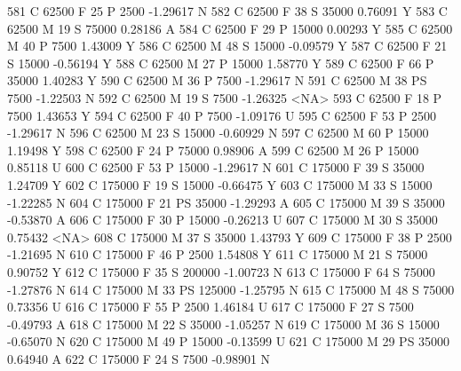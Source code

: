 \documentclass{article}
\begin{document}
\begin{Schunk}
\begin{Soutput}
581       C      62500   F  25         P   2500  -1.29617    N
582       C      62500   F  38         S  35000   0.76091    Y
583       C      62500   M  19         S  75000   0.28186    A
584       C      62500   F  29         P  15000   0.00293    Y
585       C      62500   M  40         P   7500   1.43009    Y
586       C      62500   M  48         S  15000  -0.09579    Y
587       C      62500   F  21         S  15000  -0.56194    Y
588       C      62500   M  27         P  15000   1.58770    Y
589       C      62500   F  66         P  35000   1.40283    Y
590       C      62500   M  36         P   7500  -1.29617    N
591       C      62500   M  38        PS   7500  -1.22503    N
592       C      62500   M  19         S   7500  -1.26325 <NA>
593       C      62500   F  18         P   7500   1.43653    Y
594       C      62500   F  40         P   7500  -1.09176    U
595       C      62500   F  53         P   2500  -1.29617    N
596       C      62500   M  23         S  15000  -0.60929    N
597       C      62500   M  60         P  15000   1.19498    Y
598       C      62500   F  24         P  75000   0.98906    A
599       C      62500   M  26         P  15000   0.85118    U
600       C      62500   F  53         P  15000  -1.29617    N
601       C     175000   F  39         S  35000   1.24709    Y
602       C     175000   F  19         S  15000  -0.66475    Y
603       C     175000   M  33         S  15000  -1.22285    N
604       C     175000   F  21        PS  35000  -1.29293    A
605       C     175000   M  39         S  35000  -0.53870    A
606       C     175000   F  30         P  15000  -0.26213    U
607       C     175000   M  30         S  35000   0.75432 <NA>
608       C     175000   M  37         S  35000   1.43793    Y
609       C     175000   F  38         P   2500  -1.21695    N
610       C     175000   F  46         P   2500   1.54808    Y
611       C     175000   M  21         S  75000   0.90752    Y
612       C     175000   F  35         S 200000  -1.00723    N
613       C     175000   F  64         S  75000  -1.27876    N
614       C     175000   M  33        PS 125000  -1.25795    N
615       C     175000   M  48         S  75000   0.73356    U
616       C     175000   F  55         P   2500   1.46184    U
617       C     175000   F  27         S   7500  -0.49793    A
618       C     175000   M  22         S  35000  -1.05257    N
619       C     175000   M  36         S  15000  -0.65070    N
620       C     175000   M  49         P  15000  -0.13599    U
621       C     175000   M  29        PS  35000   0.64940    A
622       C     175000   F  24         S   7500  -0.98901    N

\end{Soutput}
\end{Schunk}
\end{document}
